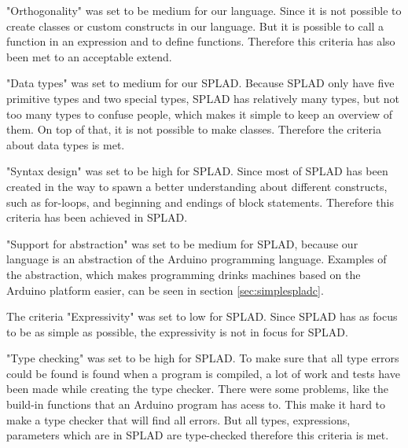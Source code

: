 "Orthogonality" was set to be medium for our language. Since it is not possible to create classes or custom constructs in our language. But it is possible to call a function in an expression and to define functions. Therefore this criteria has also been met to an acceptable extend.

"Data types" was set to medium for our SPLAD. Because SPLAD only have five primitive types and two special types, SPLAD has relatively many types, but not too many types to confuse people, which makes it simple to keep an overview of them. On top of that, it is not possible to make classes. Therefore the criteria about data types is met.

"Syntax design" was set to be high for SPLAD. Since most of SPLAD has been created in the way to spawn a better understanding about different constructs, such as for-loops, and beginning and endings of block statements. Therefore this criteria has been achieved in SPLAD.

"Support for abstraction" was set to be medium for SPLAD, because our language is an abstraction of the Arduino programming language. Examples of the abstraction, which makes programming drinks machines based on the Arduino platform easier, can be seen in section \ref{sec:simplespladc}.

The criteria "Expressivity" was set to low for SPLAD. Since SPLAD has as focus to be as simple as possible, the expressivity is not in focus for SPLAD. 

"Type checking" was set to be high for SPLAD. To make sure that all type errors could be found is found when a program is compiled, a lot of work and tests have been made while creating the type checker. There were some problems, like the build-in functions that an Arduino program has acess to. This make it hard to make a type checker that will find all errors. But all types, expressions, parameters which are in SPLAD are type-checked  therefore this criteria is met. 